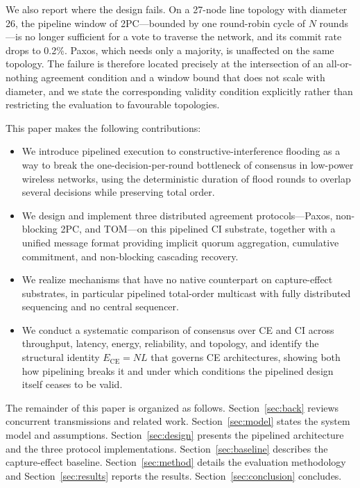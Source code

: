 \documentclass[journal]{IEEEtran}
\newcommand{\CI}{CI}                      %
\newcommand{\CE}{CE}                      %
\newcommand{\Nnodes}{N}                   %
\newcommand{\Ece}{E_{\mathrm{CE}}}        %
\begin{document}
We also report where the design fails. On a 27-node line topology with
diameter 26, the pipeline window of 2PC---bounded by one round-robin cycle
of $\Nnodes$ rounds---is no longer sufficient for a vote to traverse the
network, and its commit rate drops to 0.2\%. Paxos, which needs only a
majority, is unaffected on the same topology. The failure is therefore
located precisely at the intersection of an all-or-nothing agreement
condition and a window bound that does not scale with diameter, and we
state the corresponding validity condition explicitly rather than
restricting the evaluation to favourable topologies.

This paper makes the following contributions:

\begin{itemize}
\item We introduce pipelined execution to constructive-interference
      flooding as a way to break the one-decision-per-round bottleneck of
      consensus in low-power wireless networks, using the deterministic
      duration of flood rounds to overlap several decisions while
      preserving total order.
\item We design and implement three distributed agreement
      protocols---Paxos, non-blocking 2PC, and TOM---on this pipelined
      \CI{} substrate, together with a unified message format providing
      implicit quorum aggregation, cumulative commitment, and non-blocking
      cascading recovery.
\item We realize mechanisms that have no native counterpart on
      capture-effect substrates, in particular pipelined total-order
      multicast with fully distributed sequencing and no central sequencer.
\item We conduct a systematic comparison of consensus over \CE{} and
      \CI{} across throughput, latency, energy, reliability, and topology,
      and identify the structural identity $\Ece = \Nnodes L$ that governs
      \CE{} architectures, showing both how pipelining breaks it and under
      which conditions the pipelined design itself ceases to be valid.
\end{itemize}

The remainder of this paper is organized as follows. Section~\ref{sec:back}
reviews concurrent transmissions and related work.
Section~\ref{sec:model} states the system model and assumptions.
Section~\ref{sec:design} presents the pipelined architecture and the three
protocol implementations. Section~\ref{sec:baseline} describes the
capture-effect baseline. Section~\ref{sec:method} details the evaluation
methodology and Section~\ref{sec:results} reports the results.
Section~\ref{sec:conclusion} concludes.
\end{document}

